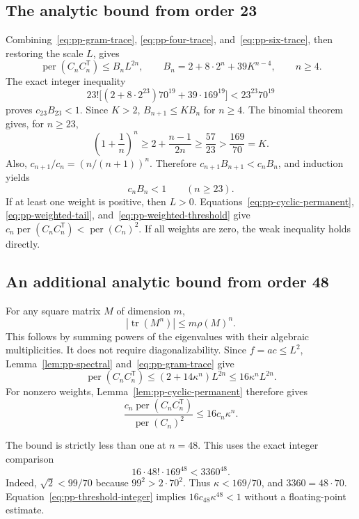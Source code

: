 \documentclass[11pt,a4paper]{article}
\theoremstyle{definition}
\theoremstyle{remark}
\newcommand{\per}{\operatorname{per}}
\newcommand{\T}{\mathsf{T}}
\begin{document}
\subsection{The analytic bound from order 23}

Combining~\eqref{eq:pp-gram-trace}, \eqref{eq:pp-four-trace}, and~\eqref{eq:pp-six-trace}, then restoring the scale $L$, gives
\begin{equation}\label{eq:pp-weighted-tail}
\per(C_nC_n^\T)\le B_nL^{2n},\qquad
B_n=2+8\cdot2^n+39K^{n-4},\qquad n\ge4.
\end{equation}
The exact integer inequality
\[
23!\bigl[(2+8\cdot2^{23})70^{19}+39\cdot169^{19}\bigr]
<23^{23}70^{19}
\]
proves $c_{23}B_{23}<1$.
Since $K>2$, $B_{n+1}\le KB_n$ for $n\ge4$.
The binomial theorem gives, for $n\ge23$,
\[
\left(1+\frac1n\right)^n
\ge2+\frac{n-1}{2n}
\ge\frac{57}{23}>\frac{169}{70}=K.
\]
Also, $c_{n+1}/c_n=(n/(n+1))^n$.
Therefore $c_{n+1}B_{n+1}<c_nB_n$, and induction yields
\begin{equation}\label{eq:pp-weighted-threshold}
c_nB_n<1\qquad(n\ge23).
\end{equation}
If at least one weight is positive, then $L>0$.
Equations~\eqref{eq:pp-cyclic-permanent}, \eqref{eq:pp-weighted-tail}, and~\eqref{eq:pp-weighted-threshold} give
$c_n\per(C_nC_n^\T)<\per(C_n)^2$.
If all weights are zero, the weak inequality holds directly.

\subsection{An additional analytic bound from order 48}

For any square matrix $M$ of dimension $m$,
\[
|\operatorname{tr}(M^n)|\le m\rho(M)^n.
\]
This follows by summing powers of the eigenvalues with their algebraic multiplicities.
It does not require diagonalizability.
Since $f=ac\le L^2$, Lemma~\ref{lem:pp-spectral} and~\eqref{eq:pp-gram-trace} give
\begin{equation}\label{eq:pp-tail-transfer}
\per(C_nC_n^\T)
\le(2+14\kappa^n)L^{2n}
\le16\kappa^nL^{2n}.
\end{equation}
For nonzero weights, Lemma~\ref{lem:pp-cyclic-permanent} therefore gives
\begin{equation}\label{eq:pp-tail-ratio}
\frac{c_n\per(C_nC_n^\T)}{\per(C_n)^2}
\le16c_n\kappa^n.
\end{equation}

The bound is strictly less than one at $n=48$.
This uses the exact integer comparison
\begin{equation}\label{eq:pp-threshold-integer}
16\cdot48!\cdot169^{48}<3360^{48}.
\end{equation}
Indeed, $\sqrt2<99/70$ because $99^2>2\cdot70^2$.
Thus $\kappa<169/70$, and $3360=48\cdot70$.
Equation~\eqref{eq:pp-threshold-integer} implies $16c_{48}\kappa^{48}<1$ without a floating-point estimate.
\end{document}
